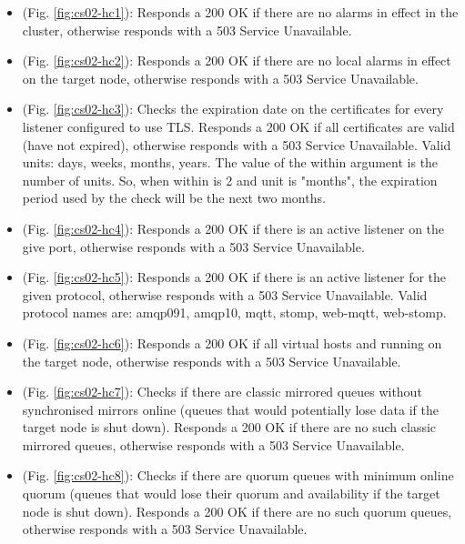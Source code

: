 \begin{itemize}
	\item {} (Fig. \ref{fig:cs02-hc1}): Responds a 200 OK if there are no alarms in effect in the cluster, otherwise responds with a 503 Service Unavailable.
	\item {} (Fig. \ref{fig:cs02-hc2}): Responds a 200 OK if there are no local alarms in effect on the target node, otherwise responds with a 503 Service Unavailable.
	\item {} (Fig. \ref{fig:cs02-hc3}):  Checks the expiration date on the certificates for every listener configured to use TLS. Responds a 200 OK if all certificates are valid (have not expired), otherwise responds with a 503 Service Unavailable. Valid units: days, weeks, months, years. The value of the within argument is the number of units. So, when within is 2 and unit is "months", the expiration period used by the check will be the next two months.
	\item {} (Fig. \ref{fig:cs02-hc4}): Responds a 200 OK if there is an active listener on the give port, otherwise responds with a 503 Service Unavailable.
	\item {} (Fig. \ref{fig:cs02-hc5}): Responds a 200 OK if there is an active listener for the given protocol, otherwise responds with a 503 Service Unavailable. Valid protocol names are: amqp091, amqp10, mqtt, stomp, web-mqtt, web-stomp.
	\item {} (Fig. \ref{fig:cs02-hc6}): Responds a 200 OK if all virtual hosts and running on the target node, otherwise responds with a 503 Service Unavailable.
	\item {} (Fig. \ref{fig:cs02-hc7}): Checks if there are classic mirrored queues without synchronised mirrors online (queues that would potentially lose data if the target node is shut down). Responds a 200 OK if there are no such classic mirrored queues, otherwise responds with a 503 Service Unavailable.
	\item {} (Fig. \ref{fig:cs02-hc8}): Checks if there are quorum queues with minimum online quorum (queues that would lose their quorum and availability if the target node is shut down). Responds a 200 OK if there are no such quorum queues, otherwise responds with a 503 Service Unavailable.
\end{itemize}


